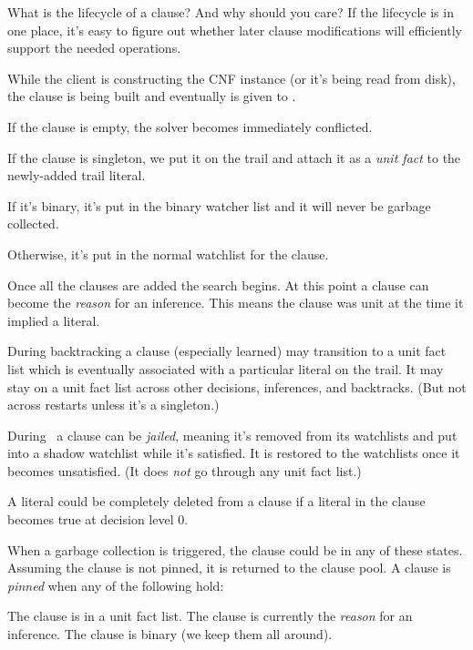 What is the lifecycle of a clause? And why should you care? If the
lifecycle
is in one place, it's easy to figure out whether later clause modifications
will
efficiently support the needed operations.

\unorderedlist

\li While the client is constructing the CNF instance (or it's being read from
disk), the clause is being built and eventually is given to .

\orderedlist

\li If the clause is empty, the solver becomes immediately conflicted.

\li If the clause is singleton, we put it on the trail and attach it as a {\it
unit fact} to the newly-added trail literal.

\li If it's binary, it's put in the binary watcher list and it will never be
garbage collected.

\li Otherwise, it's put in the normal watchlist for the clause.

\endorderedlist

\li Once all the clauses are added the search begins. At this point a clause
can
become the {\it reason} for an inference. This means the clause was unit at the
time it implied a literal.

\li During backtracking a clause (especially learned) may transition to a unit
fact list which is eventually associated with a particular literal on the
trail. It may stay on a unit fact list across other decisions, inferences, and
backtracks. (But not across restarts unless it's a singleton.)

\li During \BCP\ a clause can be {\it jailed}, meaning it's removed from its
watchlists and put into a shadow watchlist while it's satisfied. It is restored
to the watchlists once it becomes unsatisfied. (It does {\it not} go through
any
unit fact list.)

\li A literal could be completely deleted from a clause if a literal in the
clause becomes true at decision level 0.


\endunorderedlist

When a garbage collection is triggered, the clause could be in any of these
states. Assuming the clause is not pinned, it is returned to the clause pool. A
clause is {\it pinned} when any of the following hold:

\unorderedlist

\li The clause is in a unit fact list.
\li The clause is currently the {\it reason} for an inference.
\li The clause is binary (we keep them all around).

